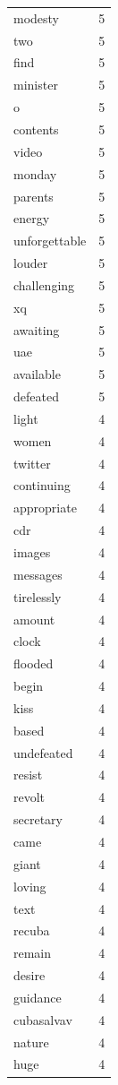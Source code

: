 \begin{tabular}{lr}
modesty & 5 \\
two & 5 \\
find & 5 \\
minister & 5 \\
o & 5 \\
contents & 5 \\
video & 5 \\
monday & 5 \\
parents & 5 \\
energy & 5 \\
unforgettable & 5 \\
louder & 5 \\
challenging & 5 \\
xq & 5 \\
awaiting & 5 \\
uae & 5 \\
available & 5 \\
defeated & 5 \\
light & 4 \\
women & 4 \\
twitter & 4 \\
continuing & 4 \\
appropriate & 4 \\
cdr & 4 \\
images & 4 \\
messages & 4 \\
tirelessly & 4 \\
amount & 4 \\
clock & 4 \\
flooded & 4 \\
begin & 4 \\
kiss & 4 \\
based & 4 \\
undefeated & 4 \\
resist & 4 \\
revolt & 4 \\
secretary & 4 \\
came & 4 \\
giant & 4 \\
loving & 4 \\
text & 4 \\
recuba & 4 \\
remain & 4 \\
desire & 4 \\
guidance & 4 \\
cubasalvav & 4 \\
nature & 4 \\
huge & 4 \\

\end{tabular}
